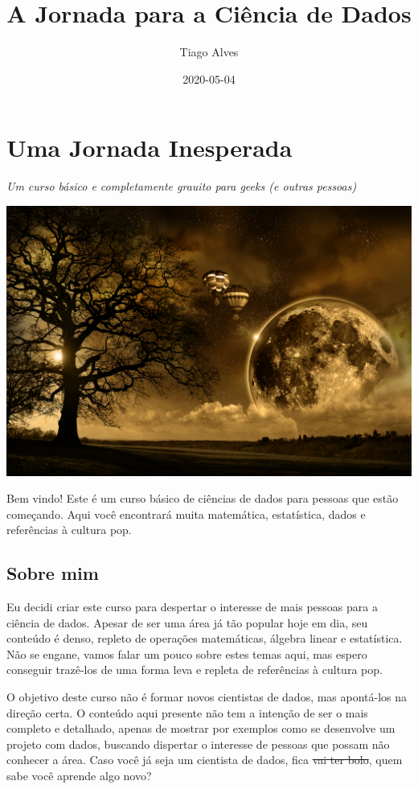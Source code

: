 \documentclass[]{book}
\title{A Jornada para a Ciência de Dados}
\author{Tiago Alves}
\date{2020-05-04}
\begin{document}
\maketitle

{
\setcounter{tocdepth}{1}
\tableofcontents
}
\hypertarget{uma-jornada-inesperada}{%
\chapter{Uma Jornada Inesperada}\label{uma-jornada-inesperada}}

\emph{Um curso básico e completamente grauito para geeks (e outras pessoas)}

\includegraphics{images/index3.jpg}

Bem vindo! Este é um curso básico de ciências de dados para pessoas que estão começando.
Aqui você encontrará muita matemática, estatística, dados e referências à cultura pop.

\hypertarget{sobre-mim}{%
\section{Sobre mim}\label{sobre-mim}}

Eu decidi criar este curso para despertar o interesse de mais pessoas para a ciência de dados. Apesar de ser uma área já tão popular hoje em dia, seu conteúdo é denso, repleto de operações matemáticas, álgebra linear e estatística. Não se engane, vamos falar um pouco sobre estes temas aqui, mas espero conseguir trazê-los de uma forma leva e repleta de referências à cultura pop.

O objetivo deste curso não é formar novos cientistas de dados, mas apontá-los na direção certa. O conteúdo aqui presente não tem a intenção de ser o mais completo e detalhado, apenas de mostrar por exemplos como se desenvolve um projeto com dados, buscando dispertar o interesse de pessoas que possam não conhecer a área. Caso você já seja um cientista de dados, fica \sout{vai ter bolo}, quem sabe você aprende algo novo?
\end{document}
